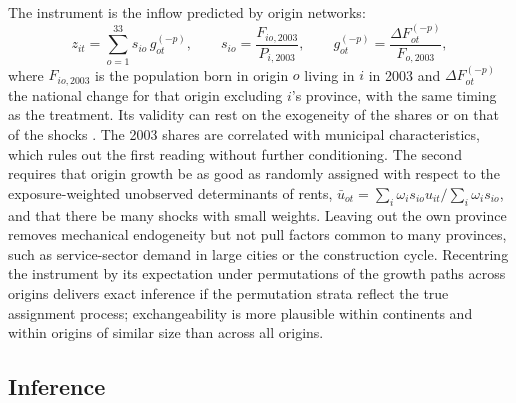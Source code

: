 \documentclass[11pt,a4paper]{article}
\begin{document}
The instrument is the inflow predicted by origin networks:
\begin{equation}\label{eq:z}
z_{it}=\sum_{o=1}^{33}s_{io}\,g^{(-p)}_{ot},\qquad s_{io}=\frac{F_{io,2003}}{P_{i,2003}},\qquad g^{(-p)}_{ot}=\frac{\Delta F^{(-p)}_{ot}}{F_{o,2003}},
\end{equation}
where $F_{io,2003}$ is the population born in origin $o$ living in $i$ in 2003 and $\Delta F^{(-p)}_{ot}$ the national change for that origin excluding $i$'s province, with the same timing as the treatment. Its validity can rest on the exogeneity of the shares \citep{goldsmith2020} or on that of the shocks \citep{borusyak2022}. The 2003 shares are correlated with municipal characteristics, which rules out the first reading without further conditioning. The second requires that origin growth be as good as randomly assigned with respect to the exposure-weighted unobserved determinants of rents, $\bar u_{ot}=\sum_i\omega_is_{io}u_{it}/\sum_i\omega_is_{io}$, and that there be many shocks with small weights. Leaving out the own province removes mechanical endogeneity but not pull factors common to many provinces, such as service-sector demand in large cities or the construction cycle. Recentring the instrument by its expectation under permutations of the growth paths across origins \citep{borusyak2023} delivers exact inference if the permutation strata reflect the true assignment process; exchangeability is more plausible within continents and within origins of similar size than across all origins.

\subsection{Inference}
\end{document}
